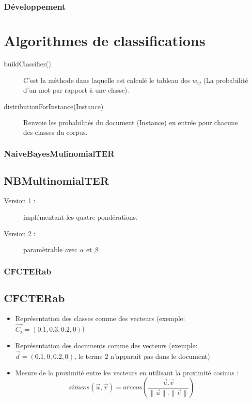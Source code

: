 \documentclass[12pt]{beamer}
\begin{document}
\begin{frame}
\frametitle{Développement}
\section{Algorithmes de classifications}
\begin{description}
\item[buildClassifier()]  C'est la méthode dans laquelle est calculé le tableau des $w_{ij}$ (La probabilité d'un mot par rapport à une classe).
\item[distributionForInstance(Instance)] Renvoie les probabilités du document (Instance) en entrée pour chacune des classes du corpus.
\end{description}


\end{frame}




\begin{frame}
\frametitle{NaiveBayesMulinomialTER}
\subsection{NBMultinomialTER}
\begin{description}
\item[Version 1 : ]  implémentant les quatre pondérations.
\item[Version 2 : ] paramètrable avec $\alpha$ et $\beta$
\end{description}


\end{frame}

\begin{frame}
\frametitle{CFCTERab}
\subsection{CFCTERab}
\begin{itemize}
\item Représentation des classes comme des vecteurs (exemple: $\vec{C_j} = (0.1,0.3,0.2,0)$)
\item Représentation des documents comme des vecteurs (exemple: $\vec{d} = (0.1,0,0.2,0)$, le terme 2 n'apparait pas dans le document)
\item Mesure de la proximité entre les vecteurs en utilisant la proximité cosinus :
\[simcos(\vec{u},\vec{v}) = arccos( \frac{\vec{u}.\vec{v}}{\|\vec{u}\|.\|\vec{v}\|})\]
\end{itemize}



\end{frame}
\end{document}
